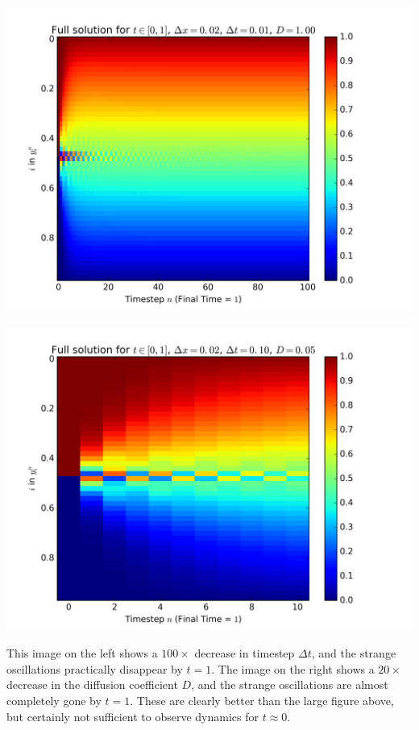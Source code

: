\documentclass{article} %
\theoremstyle{plain}
\newcommand{\Dt}{\Delta t}
\numberwithin{equation}{section} %
\numberwithin{figure}{section} %
\numberwithin{table}{section} %
\begin{document}
\begin{enumerate}[\ \ (a)]
    \begin{minipage}{0.5\textwidth}
        \includegraphics[width=\textwidth]{problem_3a_a.png}
    \end{minipage}\hfill
    \begin{minipage}{0.5\textwidth}
        \includegraphics[width=\textwidth]{problem_3a_b.png}
    \end{minipage}
    This image on the left shows a $100\times$ decrease in timestep $\Dt$, and the strange oscillations practically disappear by $t = 1$.  The image on the right shows a $20\times$ decrease in the diffusion coefficient $D$, and the strange oscillations are almost completely gone by $t=1$.  These are clearly better than the large figure above, but certainly not sufficient to observe dynamics for $t \approx 0$.


\end{enumerate}
\end{document}
